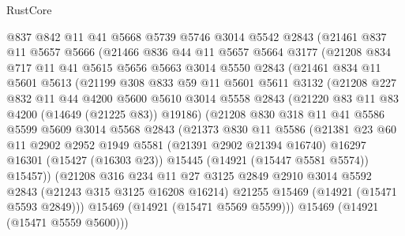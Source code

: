 \begin{lexlean}{RustCore}
\begin{coremodule}
      @837
      @842
      @11
      @41
      @5668
      @5739
      @5746
      @3014
      @5542
      @2843
      (@21461
        @837
        @11
        @5657
        @5666
        (@21466
          @836
          @44
          @11
          @5657
          @5664
          @3177
          (@21208
            @834
            @717
            @11
            @41
            @5615
            @5656
            @5663
            @3014
            @5550
            @2843
            (@21461
              @834
              @11
              @5601
              @5613
              (@21199
                @308
                @833
                @59
                @11
                @5601
                @5611
                @3132
                (@21208
                  @227
                  @832
                  @11
                  @44
                  @4200
                  @5600
                  @5610
                  @3014
                  @5558
                  @2843
                  (@21220 @83 @11 @83 @4200 (@14649 (@21225 @83)) @19186)
                  (@21208
                    @830
                    @318
                    @11
                    @41
                    @5586
                    @5599
                    @5609
                    @3014
                    @5568
                    @2843
                    (@21373
                      @830
                      @11
                      @5586
                      (@21381
                        @23
                        @60
                        @11
                        @2902
                        @2952
                        @1949
                        @5581
                        (@21391 @2902 @21394 @16740)
                        @16297
                        @16301
                        (@15427 (@16303 @23))
                        @15445
                        (@14921 (@15447 @5581 @5574))
                        @15457))
                    (@21208
                      @316
                      @234
                      @11
                      @27
                      @3125
                      @2849
                      @2910
                      @3014
                      @5592
                      @2843
                      (@21243 @315 @3125 @16208 @16214)
                      @21255
                      @15469
                      (@14921 (@15471 @5593 @2849)))
                    @15469
                    (@14921 (@15471 @5569 @5599)))
                  @15469
                  (@14921 (@15471 @5559 @5600)))

\end{coremodule}
\end{lexlean}
